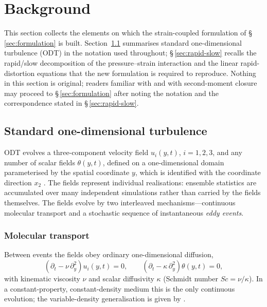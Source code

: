 \documentclass[lineno]{JFM-FLM_Au}
\begin{document}

\section{Background}\label{sec:odt}

This section collects the elements on which the strain-coupled formulation
of \S\,\ref{sec:formulation} is built. Section~\ref{sec:odt-standard}
summarises standard one-dimensional turbulence (ODT) in the notation used
throughout; \S\,\ref{sec:rapid-slow} recalls the rapid/slow decomposition
of the pressure--strain interaction and the linear rapid-distortion
equations that the new formulation is required to reproduce. Nothing in
this section is original; readers familiar with
\citet{Kerstein1999,Kerstein2001} and with second-moment closure
\citep{Pope2000} may proceed to \S\,\ref{sec:formulation} after noting the
notation and the correspondence stated in \S\,\ref{sec:rapid-slow}.

\subsection{Standard one-dimensional turbulence}\label{sec:odt-standard}

ODT evolves a three-component velocity field $u_i(y,t)$, $i=1,2,3$, and any
number of scalar fields $\theta(y,t)$, defined on a one-dimensional domain
parameterised by the spatial coordinate $y$, which is identified with the
coordinate direction $x_2$ \citep{Kerstein2001}. The fields represent
individual realisations: ensemble statistics are accumulated over many
independent simulations rather than carried by the fields themselves. The
fields evolve by two interleaved mechanisms---continuous molecular
transport and a stochastic sequence of instantaneous \emph{eddy events}.

\subsubsection{Molecular transport}

Between events the fields obey ordinary one-dimensional diffusion,
\begin{equation}
  \left(\partial_t-\nu\,\partial_y^2\right)u_i(y,t)=0,
  \qquad
  \left(\partial_t-\kappa\,\partial_y^2\right)\theta(y,t)=0,
  \label{eq:diffusion}
\end{equation}
with kinematic viscosity $\nu$ and scalar diffusivity $\kappa$
(Schmidt number $\mathit{Sc}=\nu/\kappa$). In a constant-property,
constant-density medium this is the only continuous evolution; the
variable-density generalisation is given by \citet{AshurstKerstein2005}.
\end{document}
